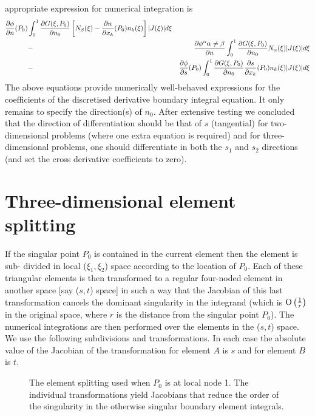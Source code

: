 appropriate expression for numerical integration is
\begin{eqnarray}
  \dfrac{\partial \phi}{\partial n} (P_{0}) &\int_{0}^{1}\frac{\partial G(\xi,P_{0})}
  {\partial n_{0}}\left[ N_{\beta}(\xi)- \dfrac{\partial n}{\partial x_{k}} (P_{0})n_{k}(\xi)\right]
  |J(\xi)|d\xi \nonumber\\
 &-& \dfrac{\partial \phi^\alpha{\alpha\neq\beta}}{\partial n} \int_{0}^{1}
  \frac{\partial G(\xi,P_{0})}{\partial n_{0}}N_{\alpha}(\xi)|J(\xi)|d\xi\nonumber\\
 &-& \dfrac{\partial \phi}{\partial s} (P_{0})\int_{0}^{1}\frac{\partial G(\xi,P_{0})}
  {\partial n_{0}} \dfrac{\partial s}{\partial x_{k}} (P_{0})n_{k}(\xi)|J(\xi)|d\xi
 \label{eqn:approp}
\end{eqnarray}
The above equations provide numerically well-behaved expressions for the
coefficients of the discretised derivative boundary integral equation.  It
only remains to specify the direction(s) of $n_{0}$.  After extensive testing
\citep{tomlinson:1996} we concluded that the direction of differentiation
should be that of $s$ (\ie  tangential) for two-dimensional problems (where
one extra equation is required) and for three-dimensional problems, one should
differentiate in both the $s_{1}$ and $s_{2}$ directions (and set the cross
derivative coefficients to zero).

\section{Three-dimensional element splitting}

If the singular point $P_{0}$ is contained in the current element then the
element is sub- divided in local ($\xi_{1}, \xi_{2}$) space according to the
location of $P_{0}$.  Each of these triangular elements is then transformed to
a regular four-noded element in another space [say ($s, t$) space] in such a
way that the Jacobian of this last transformation cancels the dominant
singularity in the integrand (which is $ \mathrm{O}\left( \frac{1}{r} \right) $ in the original
space, where $r$ is the distance from the singular point $P_{0}$).  The
numerical integrations are then performed over the elements in the ($s,t$)
space.  We use the following subdivisions and transformations.  In each case
the absolute value of the Jacobian of the transformation for element $A$ is
$s$ and for element $B$ is $t$.

\begin{figure}
\centering
 
\caption[The element splitting used when $P_{0}$ is at local node 1]{The
  element splitting used when $P_{0}$ is at local node 1.  The individual
  transformations yield Jacobians that reduce the order of the singularity in
  the otherwise singular boundary element integrals.}
\label{fig:elemsplitting}
\end{figure}

